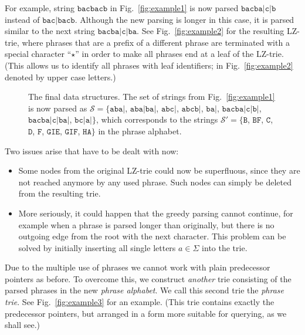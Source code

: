 \documentclass{llncs}
\newcommand{\strings}{\ensuremath{\mathcal{S}}}
\newcommand{\str}[1]{\ensuremath{\texttt{#1}}}
\begin{document}
For example, string $\str{bacbacb}$ in Fig.~\ref{fig:example1} is now parsed $\str{bacba}|\str{c}|\str{b}$ instead of $\str{bac}|\str{bacb}$. Although the new parsing is longer in this case, it is parsed similar to the next string $\str{bacba}|\str{c}|\str{ba}$. See Fig.~\ref{fig:example2} for the resulting LZ-trie, where phrases that are a prefix of a different phrase are terminated with a special character ``$\star$'' in order to make all phrases end at a leaf of the LZ-trie. (This allows us to identify all phrases with leaf identifiers; in Fig.~\ref{fig:example2} denoted by upper case letters.)

\begin{figure}[t]
  \centering
  \hfill
  \caption{The final data structures. The set of strings from Fig.~\ref{fig:example1} is now parsed as $\strings=\{\str{aba}|$, $\str{aba}|\str{ba}|$, $\str{abc}|$, $\str{abcb}|$, $\str{ba}|$, $\str{bacba}|\str{c}|\str{b}|$, $\str{bacba}|\str{c}|\str{ba}|$, $\str{bc}|\str{a}|\}$, which corresponds to the strings $\strings'=\{\str{B}$, $\str{BF}$, $\str{C}$, $\str{D}$, $\str{F}$, $\str{GIE}$, $\str{GIF}$, $\str{HA}\}$ in the phrase alphabet.}
  \label{fig:final}
\end{figure}

Two issues arise that have to be dealt with now:
\begin{itemize}
\item Some nodes from the original LZ-trie could now be superfluous, since they are not reached anymore by any used phrase. Such nodes can simply be deleted from the resulting trie.
\item More seriously, it could happen that the greedy parsing cannot continue, for example when a phrase is parsed longer than originally, but there is no outgoing edge from the root with the next character. This problem can be solved by initially inserting all single letters $a\in\Sigma$ into the trie.
\end{itemize}

Due to the multiple use of phrases we cannot work with plain predecessor pointers as before. To overcome this, we construct \emph{another} trie consisting of the parsed phrases in the new \emph{phrase alphabet}. We call this second trie the \emph{phrase trie}. See Fig.~\ref{fig:example3} for an example. (This trie contains exactly the predecessor pointers, but arranged in a form more suitable for querying, as we shall see.)
\end{document}
